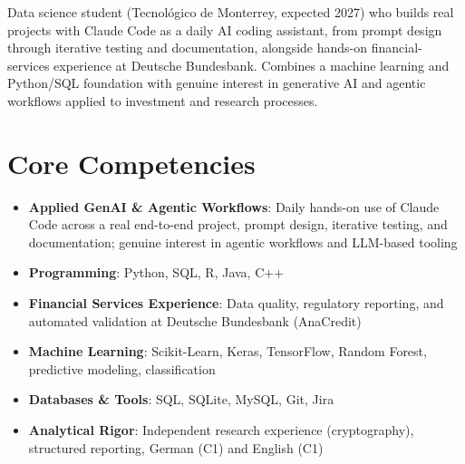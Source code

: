 \documentclass[11pt,a4paper,sans]{moderncv}
\begin{document}
\makecvtitle


\vspace{6pt}
\small{Data science student (Tecnológico de Monterrey, expected 2027) who builds real projects with Claude Code as a daily AI coding assistant, from prompt design through iterative testing and documentation, alongside hands-on financial-services experience at Deutsche Bundesbank. Combines a machine learning and Python/SQL foundation with genuine interest in generative AI and agentic workflows applied to investment and research processes.}


\section{Core Competencies}
\vspace{1pt}
\begin{itemize}

\item \textbf{Applied GenAI \& Agentic Workflows}: Daily hands-on use of Claude Code across a real end-to-end project, prompt design, iterative testing, and documentation; genuine interest in agentic workflows and LLM-based tooling

\item \textbf{Programming}: Python, SQL, R, Java, C++

\item \textbf{Financial Services Experience}: Data quality, regulatory reporting, and automated validation at Deutsche Bundesbank (AnaCredit)

\item \textbf{Machine Learning}: Scikit-Learn, Keras, TensorFlow, Random Forest, predictive modeling, classification

\item \textbf{Databases \& Tools}: SQL, SQLite, MySQL, Git, Jira

\item \textbf{Analytical Rigor}: Independent research experience (cryptography), structured reporting, German (C1) and English (C1)

\end{itemize}
\end{document}
